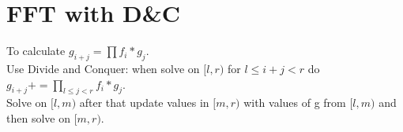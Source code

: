 \section{FFT with D&C}

To calculate $g_{i + j} = \prod f_i * g_j$.\\

Use Divide and Conquer: when solve on $[l, r)$ for $l \le i + j < r$ do $g_{i + j} += \prod_{l \le j < r} f_i * g_j$.\\

Solve on $[l, m)$ after that update values in $[m, r)$ with values of g from $[l, m)$ and then solve on $[m, r)$. 

